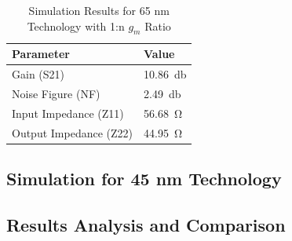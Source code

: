 \begin{table}[H]
    \centering
    \caption{Simulation Results for 65 nm Technology with 1:n $g_m$ Ratio}
    \begin{tabularx}{\textwidth}{>{\centering\arraybackslash}X >{\centering\arraybackslash}X }
        \toprule
        \textbf{Parameter} & \textbf{Value}\\
        \midrule
        Gain (S21) & \SI{10.86}{\decibel} \\
        \midrule
        Noise Figure (NF) & \SI{2.49}{\decibel} \\
        \midrule
        Input Impedance (Z11) & \SI{56.68}{\ohm} \\
        \midrule
        Output Impedance (Z22) & \SI{44.95}{\ohm} \\
        \bottomrule
    \end{tabularx}
    \label{tab:65nm_1ton_results}
\end{table}



\subsection{Simulation for 45 nm Technology}

\subsection{Results Analysis and Comparison}